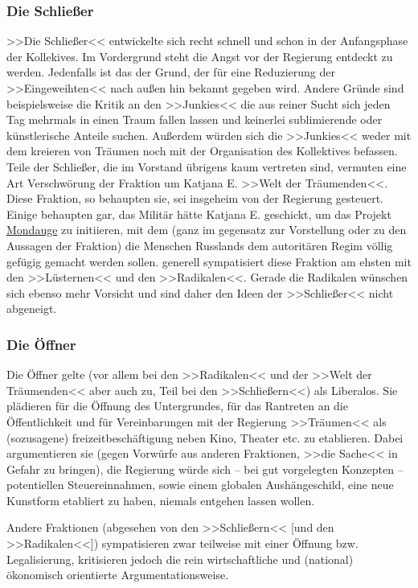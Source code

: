 \documentclass[12pt, a4paper, openany]{report}
\begin{document}
\subsubsection{Die Schließer}
>>Die Schließer<< entwickelte sich recht schnell und schon in der Anfangsphase der Kollekives. 
Im Vordergrund steht die Angst vor der Regierung entdeckt zu werden. 
Jedenfalls ist das der Grund, der für eine Reduzierung der >>Eingeweihten<< nach außen hin bekannt gegeben wird. 
Andere Gründe sind beispielsweise die Kritik an den >>Junkies<< die aus reiner Sucht sich jeden Tag mehrmals in einen Traum fallen lassen und keinerlei sublimierende oder künstlerische Anteile suchen. Außerdem würden sich die >>Junkies<< weder mit dem kreieren von Träumen noch mit der Organisation des Kollektives befassen. 
Teile der Schließer, die im Vorstand übrigens kaum vertreten sind, vermuten eine Art Verschwörung  der Fraktion um Katjana E. >>Welt der Träumenden<<.
Diese Fraktion, so behaupten sie, sei insgeheim von der Regierung gesteuert. 
Einige behaupten gar, das Militär hätte Katjana E. geschickt, um das Projekt \underline{Mondauge} zu initiieren, mit dem (ganz im gegensatz zur Vorstellung oder zu den Aussagen der Fraktion) die Menschen Russlands dem autoritären Regim völlig gefügig gemacht werden sollen. 
generell sympatisiert diese Fraktion am ehsten mit den >>Lüsternen<< und den >>Radikalen<<.
Gerade die Radikalen wünschen sich ebenso mehr Vorsicht und sind daher den Ideen der >>Schließer<< nicht abgeneigt.

\subsubsection{Die Öffner}
Die Öffner gelte (vor allem bei den >>Radikalen<< und der >>Welt der Träumenden<< aber auch zu, Teil bei den >>Schließern<<) als Liberalos. 
Sie plädieren für die Öffnung des Untergrundes, für das Rantreten an die Öffentlichkeit und für Vereinbarungen mit der Regierung >>Träumen<< als (sozusagene) freizeitbeschäftigung neben Kino, Theater etc. zu etablieren. 
Dabei argumentieren sie (gegen Vorwürfe aus anderen Fraktionen, >>die Sache<< in Gefahr zu bringen), die Regierung würde sich -- bei gut vorgelegten Konzepten -- potentiellen Steuereinnahmen, sowie einem globalen Aushängeschild, eine neue Kunstform etabliert zu haben, niemals entgehen lassen wollen.

Andere Fraktionen (abgesehen von den >>Schließern<< [und den >>Radikalen<<]) sympatisieren zwar teilweise mit einer Öffnung bzw. Legalisierung, kritisieren jedoch die rein wirtschaftliche und (national) ökonomisch orientierte Argumentationsweise.
\end{document}
